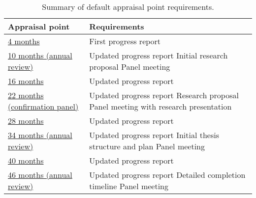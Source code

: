 \documentclass[12pt,a4paper]{article}
\begin{document}
\begin{table}[ht]
	\centering
	\begin{tabular}{p{}p{}}
		\textbf{Appraisal point} & \textbf{Requirements} \\
		\hline 
		\hyperref[sec:4months]{4 months} &	First progress report\\
		\hline
		\hyperref[sec:10months]{10 months \newline(annual review)} &	Updated progress report \newline Initial research proposal \newline Panel meeting \\ 
		\hline
		\hyperref[sec:16months]{16 months} & Updated progress report \\ 
		\hline
		\hyperref[sec:22months]{22 months \newline(confirmation panel)} & Updated progress report \newline Research proposal \newline Panel meeting with research presentation \\ 
		\hline
		\hyperref[sec:28months]{28 months} & Updated progress report \\
		\hline
		\hyperref[sec:34months]{34 months \newline(annual review)} & Updated progress report \newline Initial thesis structure and plan \newline Panel meeting \\
		\hline
		\hyperref[sec:40months]{40 months} & Updated progress report \\
		\hline
		\hyperref[sec:46months]{46 months \newline(annual review)} & Updated progress report \newline Detailed completion timeline \newline Panel meeting \\ 
	\end{tabular}
	\caption{Summary of default appraisal point requirements.}
	\label{table:points}
\end{table}
\end{document}
